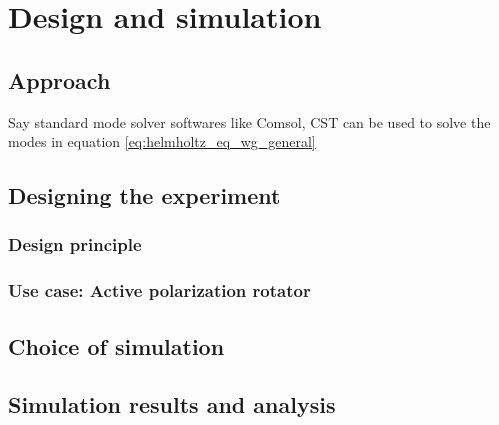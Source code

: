 \documentclass[../report.tex]{subfiles}
\begin{document}
	

\chapter{Design and simulation}
	\section{Approach}
	Say standard mode solver softwares like Comsol, CST can be used to solve the modes in equation \ref{eq:helmholtz_eq_wg_general}
	\section{Designing the experiment}

		\subsection{Design principle}
	
		\subsection{Use case: Active polarization rotator}
	
	\section{Choice of simulation}
	
	\section{Simulation results and analysis}
	
\end{document}
